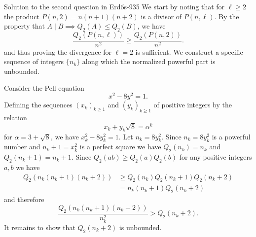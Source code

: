 \documentclass{article}
\theoremstyle{plain}
\theoremstyle{definition}
\begin{document}
\begin{solution}{Solution to the second question in Erdős-935}
We start by noting that for $\ell\geq 2$ the product $P(n, 2) = n(n+1)(n+2)$ is a divisor of $P(n, \ell)$. By the property that $A \mid B \implies Q_2(A) \le Q_2(B)$, we have
\[ \frac{Q_2(P(n, \ell))}{n^2} \ge \frac{Q_2(P(n, 2))}{n^2}. \]
and thus proving the divergence for $\ell=2$ is sufficient. We construct a specific sequence of integers $\{n_k\}$ along which the normalized powerful part is unbounded.

Consider the Pell equation
\[
x^2 - 8y^2 = 1.
\]
Defining the sequences $(x_k)_{k \ge 1}$ and $(y_k)_{k \ge 1}$ of positive integers by the relation
\[ x_k + y_k\sqrt{8} = \alpha^k\]
for $\alpha=3+\sqrt{8}$, we have $x_{k}^{2}-8y_{k}^{2}=1$.
Let $n_{k}=8y_{k}^{2}$. Since $n_k = 8y_k^2$ is a powerful number and $n_{k}+1=x_{k}^2$ is a perfect square we have $Q_{2}(n_{k})=n_{k}$ and $Q_{2}(n_{k}+1)=n_{k}+1$. Since $Q_{2}(ab)\geq Q_{2}(a)Q_{2}(b)$ for any positive integers $a,b$ we have 
\begin{align*}Q_{2}(n_{k}(n_{k}+1)(n_{k}+2))&\geq Q_{2}(n_{k})Q_{2}(n_{k}+1)Q_{2}(n_{k}+2)\\&=n_{k}(n_{k}+1)Q_{2}(n_{k}+2)
\end{align*}
and therefore
\[\frac{Q_{2}(n_{k}(n_{k}+1)(n_{k}+2))}{n_{k}^2}>Q_{2}(n_{k}+2).\]
It remains to show that $Q_{2}(n_{k}+2)$ is unbounded.


\end{solution}
\end{document}
